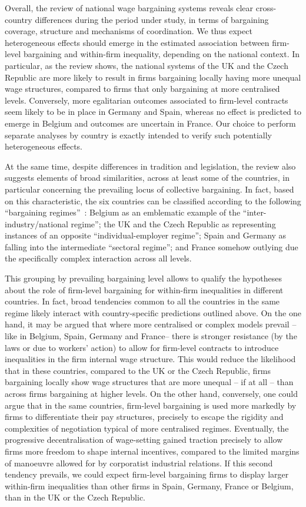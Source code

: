 \documentclass[12pt]{article}
\begin{document}
Overall, the review of national wage bargaining systems reveals clear cross-country differences during the period under study, in terms of bargaining coverage, structure and mechanisms of coordination. We thus expect heterogeneous effects should emerge in the estimated association between firm-level bargaining and within-firm inequality, depending on the national context. In particular, as the review shows, the national systems of the UK and the Czech Republic are more likely to result in firms bargaining locally having more unequal wage structures, compared to firms that only bargaining at more centralised levels. Conversely, more egalitarian outcomes associated to firm-level contracts seem likely to be in place in Germany and Spain, whereas no effect is predicted to emerge in Belgium and outcomes are uncertain in France. Our choice to perform separate analyses by country is exactly intended to verify such potentially heterogeneous effects.

At the same time, despite differences in tradition and legislation, the review also suggests elements of broad similarities, across at least some of the countries, in particular concerning the prevailing locus of collective bargaining. In fact, based on this characteristic, the six countries can be classified according to the following “bargaining regimes”~\citep[see][]{fulton.2013}: Belgium as an emblematic example of the “inter-industry/national regime”; the UK and the Czech Republic as representing instances of an opposite “individual-employer regime”; Spain and Germany as falling into the intermediate “sectoral regime”; and France somehow outlying due the specifically complex interaction across all levels.

This grouping by prevailing bargaining level allows to qualify the hypotheses about the role of firm-level bargaining for within-firm inequalities in different countries. In fact, broad tendencies common to all the countries in the same regime likely interact with country-specific predictions outlined above. On the one hand, it may be argued that where more centralised or complex models prevail -- like in Belgium, Spain, Germany and France-- there is stronger resistance (by the laws or due to workers' action) to allow for firm-level contracts to introduce inequalities in the firm internal wage structure. This would reduce the likelihood that in these countries, compared to the UK or the Czech Republic, firms bargaining locally show wage structures that are more unequal -- if at all -- than across firms bargaining at higher levels. On the other hand, conversely, one could argue that in the same countries, firm-level bargaining is used more markedly by firms to differentiate their pay structures, precisely to escape the rigidity and complexities of negotiation typical of more centralised regimes. Eventually, the progressive decentralisation of wage-setting gained traction precisely to allow firms more freedom to shape internal incentives, compared to the limited margins of manoeuvre allowed for by corporatist industrial relations. If this second tendency prevails, we could expect firm-level bargaining firms to display larger within-firm inequalities than other firms in Spain, Germany, France or Belgium, than in the UK or the Czech Republic.
\end{document}
